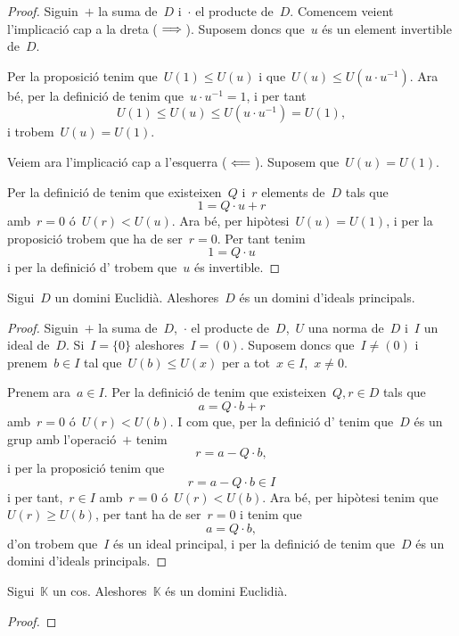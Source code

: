 \documentclass[../../main.tex]{subfiles}
\begin{document}
    \begin{proof}
        Siguin~\(+\) la suma de~\(D\) i~\(\cdot\) el producte de~\(D\).
        Comencem veient l'implicació cap a la dreta (\(\implies\)).
        Suposem doncs que~\(u\) és un element invertible de~\(D\).

        Per la proposició  tenim que~\(U(1)\leq U(u)\) i que~\(U(u)\leq U(u\cdot u^{-1})\).
        Ara bé, per la definició de  tenim que~\(u\cdot u^{-1}=1\), i per tant
        \[
            U(1)\leq U(u)\leq U(u\cdot u^{-1})=U(1),
        \]
        i trobem~\(U(u)=U(1)\).

        Veiem ara l'implicació cap a l'esquerra (\(\impliedby\)).
        Suposem que~\(U(u)=U(1)\).

        Per la definició de  tenim que existeixen~\(Q\) i~\(r\) elements de~\(D\) tals que
        \[
            1=Q\cdot u+r
        \]
        amb~\(r=0\) ó~\(U(r)<U(u)\).
        Ara bé, per hipòtesi~\(U(u)=U(1)\), i per la proposició  trobem que ha de ser~\(r=0\).
        Per tant tenim
        \[
            1=Q\cdot u
        \]
        i per la definició d' trobem que~\(u\) és invertible.
    \end{proof}
    \begin{theorem}
        Sigui~\(D\) un domini Euclidià.
        Aleshores~\(D\) és un domini d'ideals principals.
    \end{theorem}
    \begin{proof}
        Siguin~\(+\) la suma de~\(D\),~\(\cdot\) el producte de~\(D\),~\(U\) una norma de~\(D\) i~\(I\) un ideal de~\(D\).
        Si~\(I=\{0\}\) aleshores~\(I=(0)\).
        Suposem doncs que~\(I\neq(0)\) i prenem~\(b\in I\) tal que~\(U(b)\leq U(x)\) per a tot~\(x\in I\),~\(x\neq0\).

        Prenem ara~\(a\in I\).
        Per la definició de  tenim que existeixen~\(Q,r\in D\) tals que
        \[
            a=Q\cdot b+r
        \]
        amb~\(r=0\) ó~\(U(r)<U(b)\).
        I com que, per la definició d' tenim que~\(D\) és un grup amb l'operació~\(+\) tenim
        \[
            r=a-Q\cdot b,
        \]
        i per la proposició  tenim que
        \[
            r=a-Q\cdot b\in I
        \]
        i per tant,~\(r\in I\) amb~\(r=0\) ó~\(U(r)<U(b)\).
        Ara bé, per hipòtesi tenim que~\(U(r)\geq U(b)\), per tant ha de ser~\(r=0\) i tenim que
        \[
            a=Q\cdot b,
        \]
        d'on trobem que~\(I\) és un ideal principal, i per la definició de  tenim que~\(D\) és un domini d'ideals principals.
    \end{proof}
    \begin{theorem}
        Sigui~\(\mathbb{K}\) un cos.
        Aleshores~\(\mathbb{K}\) és un domini Euclidià.
    \end{theorem}
    \begin{proof}
    \end{proof}
\end{document}
